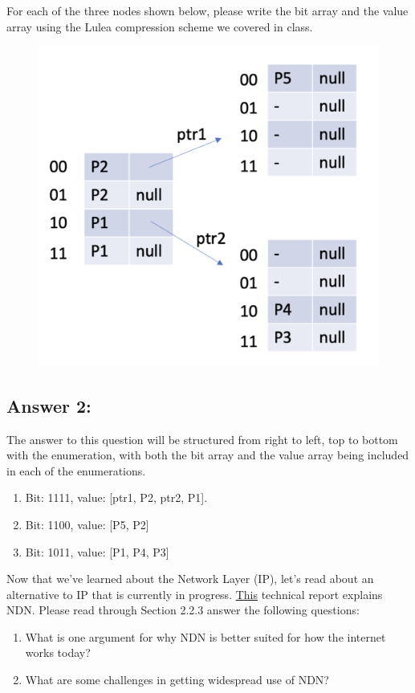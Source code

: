 \documentclass[10pt]{article}
\newenvironment{problem}[2][Problem]{\begin{trivlist}
\item[\hskip \labelsep {\bfseries #1}\hskip \labelsep {\bfseries #2.}]}{\end{trivlist}}
\begin{document}
\begin{problem} {2: Lulea Compression}

For each of the three nodes shown below, please write the bit array and the value array using the Lulea compression scheme we covered in class.

\begin{figure}[h]
    \centering
    \includegraphics[scale=0.5]{figures/trie_nodes.pdf}
    \label{fig:dvp}
\end{figure}

\end{problem}

\subsection*{Answer 2:}
The answer to this question will be structured from right to left, top to bottom with the enumeration, with both the bit array and the value array being included in each of the enumerations.
\begin{enumerate}
    \item[(a)] Bit: 1111, value: [ptr1, P2, ptr2, P1].
    \item[(b)] Bit: 1100, value: [P5, P2]
    \item[(c)] Bit: 1011, value: [P1, P4, P3]  
\end{enumerate}
\begin{problem}{3: Reading}
Now that we've learned about the Network Layer (IP), let's read about an alternative to IP that is currently in progress. \href{https://named-data.net/techreport/TR001ndn-proj.pdf}{This} technical report explains NDN. Please read through Section 2.2.3 answer the following questions:
\begin{enumerate}
    \item What is one argument for why NDN is better suited for how the internet works today?
    \item What are some challenges in getting widespread use of NDN?
\end{enumerate}
\end{problem}
\end{document}

